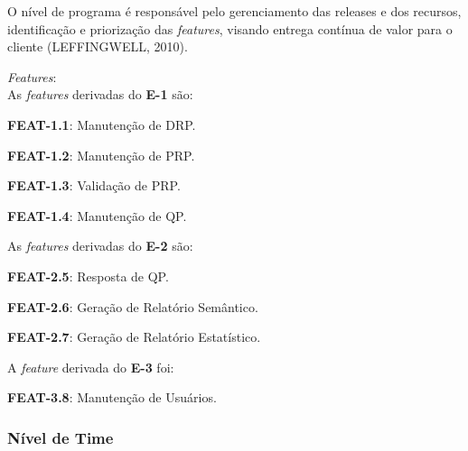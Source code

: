 			O nível de programa é responsável pelo gerenciamento das releases e dos recursos, identificação e priorização das \textit{features}, visando entrega contínua de valor para o cliente (LEFFINGWELL, 2010).

			\begin{itemize}
			{
				\item \textit{Features}:\\
				As \textit{features} derivadas do \textbf{E-1} são:
				\begin{itemize}
				{
					\item \textbf{FEAT-1.1}: Manutenção de DRP.\\

					\item \textbf{FEAT-1.2}: Manutenção de PRP.\\

					\item \textbf{FEAT-1.3}: Validação de PRP.\\

					\item \textbf{FEAT-1.4}: Manutenção de QP.\\
				}
				\end{itemize}

				As \textit{features} derivadas do \textbf{E-2} são:
				\begin{itemize}
				{
					\item \textbf{FEAT-2.5}: Resposta de QP.\\

					\item \textbf{FEAT-2.6}: Geração de Relatório Semântico.\\

					\item \textbf{FEAT-2.7}: Geração de Relatório Estatístico.\\
				}
				\end{itemize}

				A \textit{feature} derivada do \textbf{E-3} foi:
				\begin{itemize}
				{
					\item \textbf{FEAT-3.8}: Manutenção de Usuários.\\
				}
				\end{itemize}
			}
			\end{itemize}

		\subsubsection{Nível de Time}

